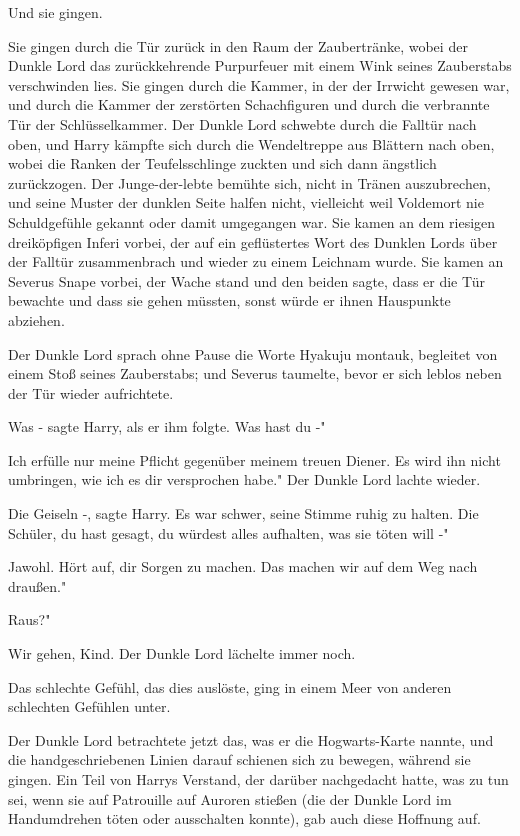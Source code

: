 Und sie gingen.

Sie gingen durch die Tür zurück in den Raum der Zaubertränke, wobei der Dunkle
Lord das zurückkehrende Purpurfeuer mit einem Wink seines Zauberstabs
verschwinden lies. Sie gingen durch die Kammer, in der der Irrwicht gewesen war,
und durch die Kammer der zerstörten Schachfiguren und durch die verbrannte Tür
der Schlüsselkammer. Der Dunkle Lord schwebte durch die Falltür nach oben, und
Harry kämpfte sich durch die Wendeltreppe aus Blättern nach oben, wobei die
Ranken der Teufelsschlinge zuckten und sich dann ängstlich zurückzogen. Der
Junge-der-lebte bemühte sich, nicht in Tränen auszubrechen, und seine Muster der
dunklen Seite halfen nicht, vielleicht weil Voldemort nie Schuldgefühle gekannt
oder damit umgegangen war. Sie kamen an dem riesigen dreiköpfigen Inferi vorbei,
der auf ein geflüstertes Wort des Dunklen Lords über der Falltür zusammenbrach
und wieder zu einem Leichnam wurde. Sie kamen an Severus Snape vorbei, der Wache
stand und den beiden sagte, dass er die Tür bewachte und dass sie gehen müssten,
sonst würde er ihnen Hauspunkte abziehen.

Der Dunkle Lord sprach ohne Pause die Worte \glqq{}Hyakuju montauk\grqq{},
begleitet von einem Stoß seines Zauberstabs; und Severus taumelte, bevor er sich
leblos neben der Tür wieder aufrichtete.

\glqq{}Was -\grqq{} sagte Harry, als er ihm folgte. \glqq{}Was hast du -"

\glqq{}Ich erfülle nur meine Pflicht gegenüber meinem treuen Diener. Es wird ihn
nicht umbringen, wie ich es dir versprochen habe." Der Dunkle Lord lachte
wieder.

\glqq{}Die Geiseln -\grqq{}, sagte Harry. Es war schwer, seine Stimme ruhig zu
halten. \glqq{}Die Schüler, du hast gesagt, du würdest alles aufhalten, was sie
töten will -"

\glqq{}Jawohl. Hört auf, dir Sorgen zu machen. Das machen wir auf dem Weg nach
draußen."

\glqq{}Raus?"

\glqq{}Wir gehen, Kind.\grqq{} Der Dunkle Lord lächelte immer noch.

Das schlechte Gefühl, das dies auslöste, ging in einem Meer von anderen
schlechten Gefühlen unter.

Der Dunkle Lord betrachtete jetzt das, was er die Hogwarts-Karte nannte, und die
handgeschriebenen Linien darauf schienen sich zu bewegen, während sie gingen.
Ein Teil von Harrys Verstand, der darüber nachgedacht hatte, was zu tun sei,
wenn sie auf Patrouille auf Auroren stießen (die der Dunkle Lord im Handumdrehen
töten oder ausschalten konnte), gab auch diese Hoffnung auf.

